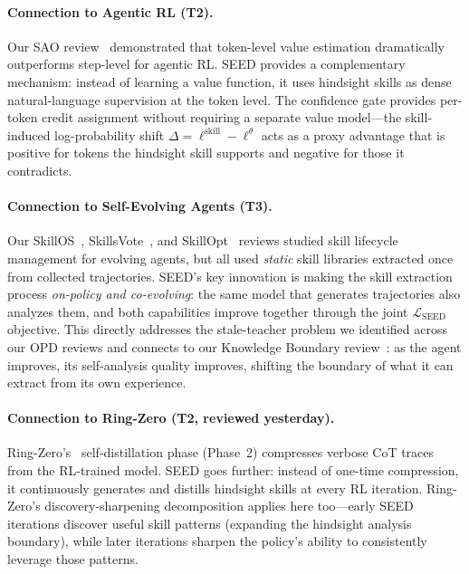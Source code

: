 \documentclass[11pt,a4paper]{article}
\begin{document}
\paragraph{Connection to Agentic RL (T2).} Our SAO review~\cite{sao2026} demonstrated that token-level value estimation dramatically outperforms step-level for agentic RL. SEED provides a complementary mechanism: instead of learning a value function, it uses hindsight skills as dense natural-language supervision at the token level. The confidence gate provides per-token credit assignment without requiring a separate value model---the skill-induced log-probability shift $\Delta = \ell^{\mathrm{skill}} - \ell^{\theta}$ acts as a proxy advantage that is positive for tokens the hindsight skill supports and negative for those it contradicts.

\paragraph{Connection to Self-Evolving Agents (T3).} Our SkillOS~\cite{skillos2026}, SkillsVote~\cite{skillsvote2026}, and SkillOpt~\cite{skillopt2026} reviews studied skill lifecycle management for evolving agents, but all used \emph{static} skill libraries extracted once from collected trajectories. SEED's key innovation is making the skill extraction process \emph{on-policy and co-evolving}: the same model that generates trajectories also analyzes them, and both capabilities improve together through the joint $\mathcal{L}_{\mathrm{SEED}}$ objective. This directly addresses the stale-teacher problem we identified across our OPD reviews and connects to our Knowledge Boundary review~\cite{searchgen2026}: as the agent improves, its self-analysis quality improves, shifting the boundary of what it can extract from its own experience.

\paragraph{Connection to Ring-Zero (T2, reviewed yesterday).} Ring-Zero's~\cite{ringzero2026} self-distillation phase (Phase~2) compresses verbose CoT traces from the RL-trained model. SEED goes further: instead of one-time compression, it continuously generates and distills hindsight skills at every RL iteration. Ring-Zero's discovery-sharpening decomposition applies here too---early SEED iterations discover useful skill patterns (expanding the hindsight analysis boundary), while later iterations sharpen the policy's ability to consistently leverage those patterns.
\end{document}

